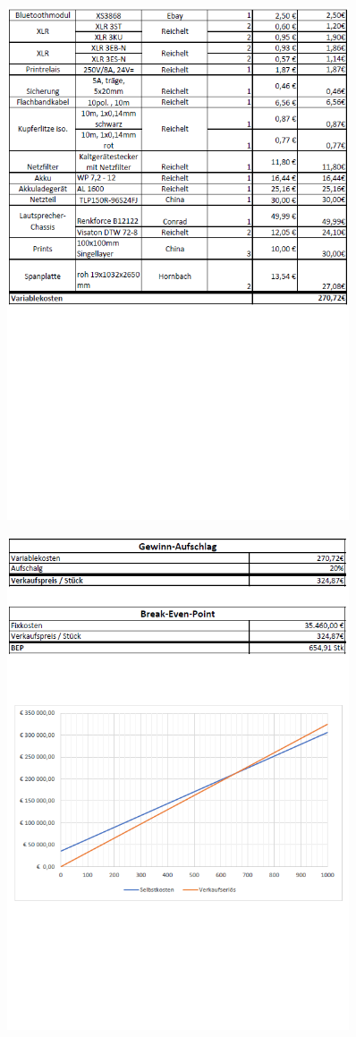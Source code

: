 \begin{figure} [H]
\centering
\includegraphics[width=0.9\textwidth]{form/Materialkosten2.png}
\end{figure}
\begin{figure} [H]
	\centering
	\includegraphics[width=0.9\textwidth]{form/BEP.png}
\end{figure}